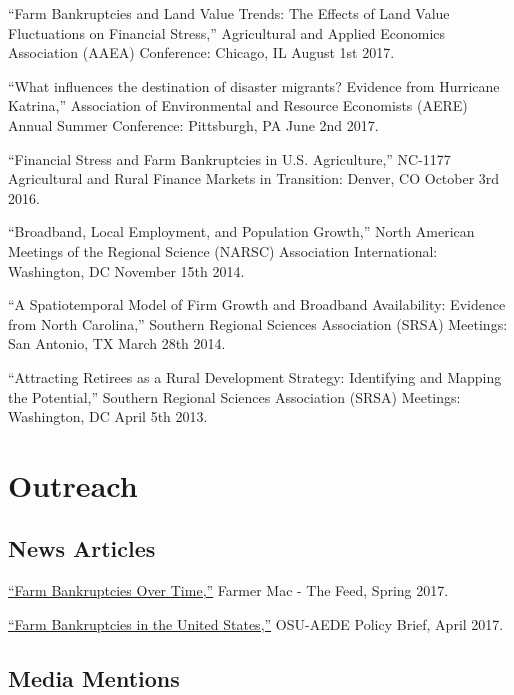 \documentclass[letterpaper]{article}
\renewenvironment{itemize}{
  \begin{list}{}{
    \setlength{\leftmargin}{1.5em}
  }
}{
  \end{list}
}
\begin{document}
\begin{itemize}
\item ``Farm Bankruptcies and Land Value Trends: The Effects of Land Value Fluctuations on Financial Stress,'' Agricultural and Applied Economics Association (AAEA) Conference: Chicago, IL August 1st 2017.
\item ``What influences the destination of disaster migrants? Evidence from Hurricane Katrina,'' Association of Environmental and Resource Economists (AERE) Annual Summer Conference: Pittsburgh, PA June 2nd 2017.
\item ``Financial Stress and Farm Bankruptcies in U.S. Agriculture,'' NC-1177 Agricultural and Rural Finance Markets in Transition: Denver, CO October 3rd 2016.
\item ``Broadband, Local Employment, and Population Growth,'' North American Meetings of the Regional Science (NARSC) Association International: Washington, DC November 15th 2014.
\item ``A Spatiotemporal Model of Firm Growth and Broadband Availability: Evidence from North Carolina,'' Southern Regional Sciences Association (SRSA) Meetings: San Antonio, TX March 28th 2014.
\item ``Attracting Retirees as a Rural Development Strategy: Identifying and Mapping the Potential,'' Southern Regional Sciences Association (SRSA) Meetings: Washington, DC April 5th 2013.
\end{itemize}

\section*{Outreach}

\subsection*{News Articles}

\begin{itemize}
\item \href{https://www.farmermac.com/2017-spring-feed/mobile/index.html#p=1}{``Farm Bankruptcies Over Time,''} Farmer Mac - The Feed, Spring 2017.
\item \href{https://aede.osu.edu/sites/aede/files/publication_files/Farm%20Bankruptcies%20-%20Policy%20Brief.pdf}{``Farm Bankruptcies in the United States,''} OSU-AEDE Policy Brief, April 2017.
\end{itemize}

\subsection*{Media Mentions}
\end{document}
